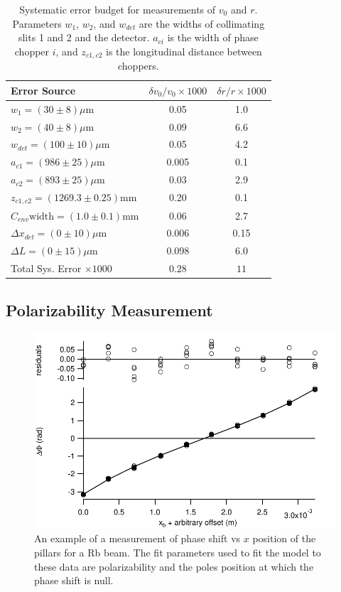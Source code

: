 \documentclass[twocolumn,prl,showpacs,superscriptaddress]{revtex4-1}   %
\newcommand{\sigv}{0.28}
\newcommand{\sigr}{11}
\begin{document}
\begingroup
\begin{table}
\caption{\label{tableVelError}Systematic error budget for measurements of $v_0$ and $r$. Parameters $w_1$, $w_2$, and $w_{det}$ are the widths of collimating slits 1 and 2 and the detector. $a_{ci}$ is the width of phase chopper $i$, and $z_{c1,c2}$ is the longitudinal distance between choppers.}
\begin{center}
\begin{tabular}{l c c}
\hline\hline
Error Source & $\delta v_0/v_0 \times 1000$ & $\delta r/r \times 1000$ \\
\hline
$w_1 = (30 \pm 8) \mu\mathrm{m}$ 		& 0.05 & 1.0 \\
$w_2 = (40 \pm 8) \mu\mathrm{m}$ 		& 0.09 & 6.6 \\
$w_{det} = (100 \pm 10) \mu\mathrm{m}$ 		& 0.05 & 4.2 \\
$a_{c1} = (986 \pm 25) \mu\mathrm{m}$ 		& 0.005 & 0.1 \\
$a_{c2} = (893 \pm 25) \mu\mathrm{m}$ 		& 0.03 & 2.9 \\
$z_{c1,c2} = (1269.3 \pm 0.25) \mathrm{mm}$ 		& 0.20 & 0.1 \\
$C_{env} \mathrm{width} = (1.0 \pm 0.1) \mathrm{mm}$ 		& 0.06 & 2.7 \\
$\Delta x_{det} = (0 \pm 10) \mu\mathrm{m}$ 		& 0.006 & 0.15 \\
$\Delta L = (0 \pm 15) \mu\mathrm{m}$		& 0.098 & 6.0 \\
\hline
Total Sys. Error $\times 1000$ & $\sigv$ & $\sigr$ \\
\hline\hline
\end{tabular}
\end{center}
\end{table}
\endgroup

\subsection{Polarizability Measurement}

\begin{figure}
\includegraphics[width=\linewidth,keepaspectratio]{dPvMP_150327_q.pdf}
\caption{\label{dPvMPExample}An example of a measurement of phase shift vs $x$ position of the pillars for a Rb beam. The fit parameters used to fit the model to these data are polarizability and the poles position at which the phase shift is null.}
\end{figure}
\end{document}
